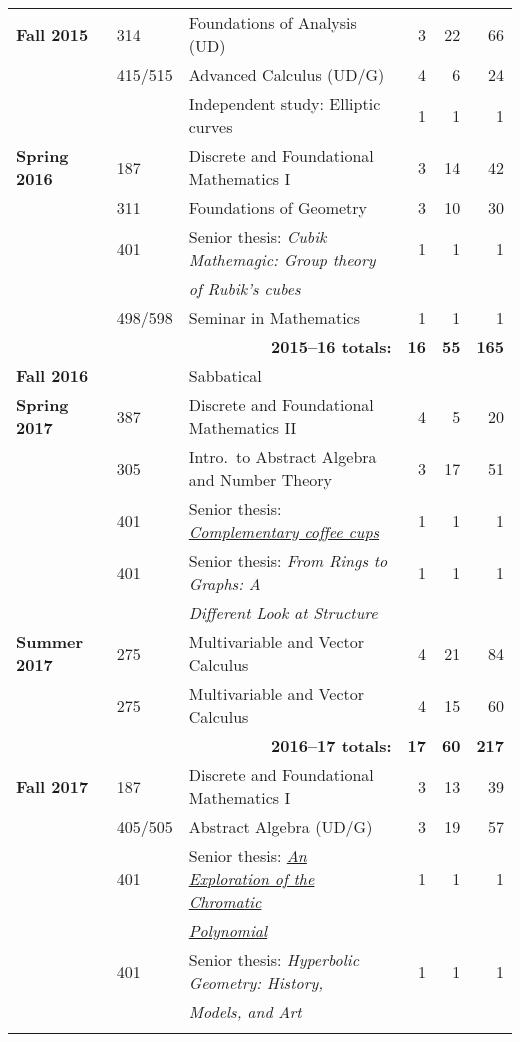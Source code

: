 \documentclass[12pt]{article}
\begin{document}
\begin{center}
\begin{longtable}{@{} l l l rrr @{}}
\textbf{Fall 2015} & 314 & Foundations of Analysis (UD) & 3 & 22 & 66 \\
 & 415/515 & Advanced Calculus (UD/G) & 4 & 6 & 24 \\
 & & Independent study: Elliptic curves & 1 & 1 & 1 \\
\addlinespace[0.1in]

\textbf{Spring 2016} & 187 & Discrete and Foundational Mathematics I & 3 & 14 & 42 \\
 & 311 & Foundations of Geometry & 3 & 10 & 30 \\
 & 401 & Senior thesis: \emph{Cubik Mathemagic: Group theory} & 1 & 1 & 1 \\
 & & \qquad \emph{of Rubik's cubes} & & \\
 & 498/598 & Seminar in Mathematics & 1 & 1 & 1 \\

 \cmidrule{3-6}
 & & \multicolumn{1}{r}{\textbf{2015--16 totals:}} & \textbf{16} & \textbf{55} & \textbf{165} \\
 \cmidrule{3-6}

\textbf{Fall 2016} & & Sabbatical & & & \\
\addlinespace[0.1in]

\textbf{Spring 2017} & 387 & Discrete and Foundational Mathematics II & 4 & 5 & 20 \\
 & 305 & Intro.\ to Abstract Algebra and Number Theory & 3 & 17 & 51 \\
 & 401 & Senior thesis: \href{https://scholarworks.boisestate.edu/math_undergraduate_theses/6/}{\emph{Complementary coffee cups}} & 1 & 1 & 1 \\
 & 401 & Senior thesis: \emph{From Rings to Graphs: A} & 1 & 1 & 1 \\
 & & \qquad \emph{Different Look at Structure} & & \\
\addlinespace[0.1in]

\textbf{Summer 2017} & 275 & Multivariable and Vector Calculus & 4 & 21 & 84 \\
                     & 275 & Multivariable and Vector Calculus & 4 & 15 & 60 \\

 \cmidrule{3-6}
 & & \multicolumn{1}{r}{\textbf{2016--17 totals:}} & \textbf{17} & \textbf{60} & \textbf{217} \\
 \cmidrule{3-6}

\textbf{Fall 2017} & 187 & Discrete and Foundational Mathematics I & 3 & 13 & 39 \\
 & 405/505 & Abstract Algebra (UD/G) & 3 & 19 & 57 \\
 & 401 & Senior thesis: \href{https://scholarworks.boisestate.edu/math_undergraduate_theses/7/}{\emph{An Exploration of the Chromatic}} & 1 & 1 & 1 \\
 & & \qquad \href{https://scholarworks.boisestate.edu/math_undergraduate_theses/7/}{\emph{Polynomial}} & & \\
 & 401 & Senior thesis: \emph{Hyperbolic Geometry: History,} & 1 & 1 & 1 \\
 & & \qquad \emph{Models, and Art} & & \\
\addlinespace[0.1in]


\end{longtable}
\end{center}
\end{document}
